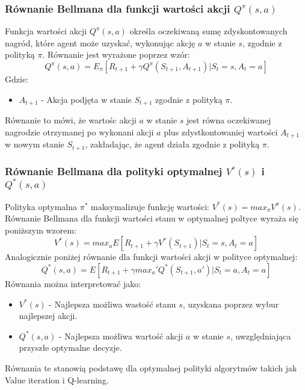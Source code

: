 \documentclass[a4paper, 10pt]{article}
\begin{document}
    \subsubsection{Równanie Bellmana dla funkcji wartości akcji \( Q^\pi(s,a) \)}
    Funkcja wartości akcji \( Q^\pi(s,a) \) określa oczekiwaną sumę zdyskontowanych nagród, które agent może uzyskać, wykonując akcję \( a \) w stanie \( s \), zgodnie z polityką \( \pi \).
    Równanie jest wyrażone poprzez wzór:
    \[ Q^\pi(s,a) = E_\pi[R_{t+1} + \gamma Q^\pi(S_{t+1}, A_{t+1})|S_t = s, A_t = a] \]
    Gdzie:
    \begin{itemize}
        \item \( A_{t+1} \) - Akcja podjęta w stanie \( S_{t+1} \) zgodnie z polityką \( \pi \).
    \end{itemize}
    Równanie to mówi, że wartośc akcji \( a \) w stanie \( s \) jest równa oczekiwanej nagrodzie otrzymanej po wykonani akcji \( a \) plus zdystkontowaniej wartości
    \( A_{t+1} \) w nowym stanie \( S_{t+1} \), zakładając, że agent działa zgodnie z polityką \( \pi \).
    \subsubsection{Równanie Bellmana dla polityki optymalnej \( V^*(s) \) i \( Q^*(s,a) \)}
    Polityka optymalna \( \pi^* \) maksymalizuje funkcję wartości: \( V^*(s) = max_\pi V^\pi(s) \).
    Równanie Bellmana dla funkcji wartości stanu w optymalnej poltyce wyraża się poniższym wzorem:
    \[ V^*(s) = max_a E[R_{t+1} + \gamma V^*(S_{t+1})|S_t = s, A_t = a] \]
    Analogicznie poniżej równanie dla funkcji wartości akcji w polityce optymalnej:
    \[ Q^*(s,a) = E[R_{t+1} + \gamma max_a' Q^*(S_{t+1},a')|S_t = a, A_t = a] \]
    Równania można interpretować jako:
    \begin{itemize}
        \item \( V^*(s) \) - Najlepsza możliwa wastość stanu \( s \), uzyskana poprzez wybur najlepszej akcji.
        \item \( Q^*(s,a) \) - Najlepsza możliwa wartość akcji \( a \) w stanie \( s \), uwzględniająca przyszłe optymalne decyzje.
    \end{itemize}
    Równania te stanowią podstawę dla optymalnej polityki algorytmów takich jak Value iteration i Q-learning.
\end{document}

